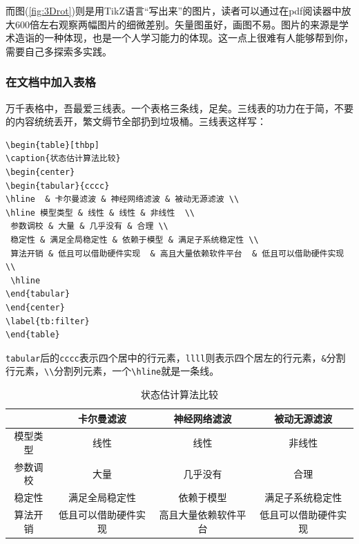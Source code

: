 而图(\ref{fig:3Drot})则是用TikZ语言“写出来”的图片，读者可以通过在pdf阅读器中放大600倍左右观察两幅图片的细微差别。矢量图虽好，画图不易。图片的来源是学术造诣的一种体现，也是一个人学习能力的体现。这一点上很难有人能够帮到你，需要自己多探索多实践。
\subsubsection{在文档中加入表格}
万千表格中，吾最爱三线表。一个表格三条线，足矣。三线表的功力在于简，不要的内容统统丢开，繁文缛节全部扔到垃圾桶。三线表这样写：
\begin{verbatim}
\begin{table}[thbp]
\caption{状态估计算法比较}
\begin{center}
\begin{tabular}{cccc}
\hline  & 卡尔曼滤波 & 神经网络滤波 & 被动无源滤波 \\ 
\hline 模型类型 & 线性 & 线性 & 非线性  \\ 
 参数调校 & 大量 & 几乎没有 & 合理 \\ 
 稳定性 & 满足全局稳定性 & 依赖于模型 & 满足子系统稳定性 \\ 
 算法开销 & 低且可以借助硬件实现  & 高且大量依赖软件平台  & 低且可以借助硬件实现  \\ 
 \hline
\end{tabular} 
\end{center}
\label{tb:filter}
\end{table}
\end{verbatim}
\verb|tabular|后的\verb|cccc|表示四个居中的行元素，\verb|llll|则表示四个居左的行元素，\verb|&|分割行元素，\verb|\\|分割列元素，一个\verb|\hline|就是一条线。
\begin{table}[thbp]
\caption{状态估计算法比较}
\begin{center}
\begin{tabular}{cccc}
\hline  & 卡尔曼滤波 & 神经网络滤波 & 被动无源滤波 \\ 
\hline 模型类型 & 线性 & 线性 & 非线性  \\ 
 参数调校 & 大量 & 几乎没有 & 合理 \\ 
 稳定性 & 满足全局稳定性 & 依赖于模型 & 满足子系统稳定性 \\ 
 算法开销 & 低且可以借助硬件实现  & 高且大量依赖软件平台  & 低且可以借助硬件实现  \\ 
 \hline
\end{tabular} 
\end{center}
\label{tb:filter}
\end{table}
